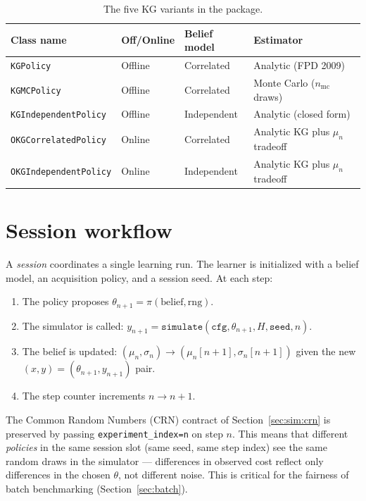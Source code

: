 \documentclass[11pt]{article}
\newcommand{\Cstar}{\theta}
\newcommand{\muN}{\mu_n}
\newcommand{\sigN}{\sigma_n}
\newcommand{\code}[1]{\texttt{#1}}
\begin{document}
\begin{table}[h]
\centering
\begin{tabular}{@{}llll@{}}
  \toprule
  Class name & Off/Online & Belief model & Estimator \\
  \midrule
  \code{KGPolicy}                & Offline & Correlated  & Analytic (FPD 2009) \\
  \code{KGMCPolicy}              & Offline & Correlated  & Monte Carlo ($n_{\mathrm{mc}}$ draws) \\
  \code{KGIndependentPolicy}     & Offline & Independent & Analytic (closed form) \\
  \code{OKGCorrelatedPolicy}     & Online  & Correlated  & Analytic KG plus $\muN$ tradeoff \\
  \code{OKGIndependentPolicy}    & Online  & Independent & Analytic KG plus $\muN$ tradeoff \\
  \bottomrule
\end{tabular}
\caption{The five KG variants in the package.}
\end{table}

\section{Session workflow}
\label{sec:session}

A \emph{session} coordinates a single learning run. The learner is
initialized with a belief model, an acquisition policy, and a session seed.
At each step:

\begin{enumerate}[nosep]
  \item The policy proposes $\Cstar_{n+1} = \pi(\mathrm{belief}, \mathrm{rng})$.
  \item The simulator is called: $y_{n+1} = \code{simulate}(\code{cfg}, \Cstar_{n+1}, H, \code{seed}, n)$.
  \item The belief is updated: $(\muN, \sigN) \to (\muN[n+1], \sigN[n+1])$
    given the new $(x, y) = (\Cstar_{n+1}, y_{n+1})$ pair.
  \item The step counter increments $n \to n+1$.
\end{enumerate}

The Common Random Numbers (CRN) contract of Section~\ref{sec:sim:crn} is
preserved by passing \code{experiment\_index=n} on step $n$. This means
that different \emph{policies} in the same session slot (same seed, same
step index) see the same random draws in the simulator — differences in
observed cost reflect only differences in the chosen $\Cstar$, not
different noise. This is critical for the fairness of batch benchmarking
(Section~\ref{sec:batch}).
\end{document}
